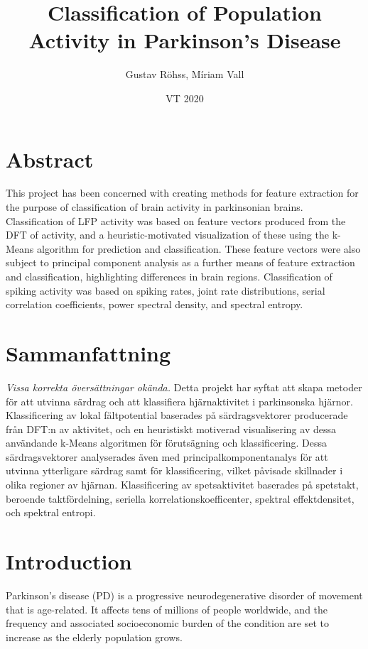 \documentclass{article}
\title{Classification of Population Activity in Parkinson's Disease}
\author{Gustav Röhss, Míriam Vall}
\date{VT 2020}
\begin{document}
\maketitle

\section*{Abstract}

This project has been concerned with creating methods for feature extraction for the purpose of classification of brain activity in parkinsonian brains. 
Classification of LFP activity was based on feature vectors produced from the DFT of activity, and a heuristic-motivated visualization of these using the k-Means algorithm for prediction and classification.
These feature vectors were also subject to principal component analysis as a further means of feature extraction and classification, highlighting differences in brain regions. 
Classification of spiking activity was based on spiking rates, joint rate distributions, serial correlation coefficients, power spectral density, and spectral entropy.

\section*{Sammanfattning}

\textit{Vissa korrekta översättningar okända.}
Detta projekt har syftat att skapa metoder för att utvinna särdrag och att klassifiera hjärnaktivitet i parkinsonska hjärnor.
Klassificering av lokal fältpotential baserades på särdragsvektorer producerade från DFT:n av aktivitet, och en heuristiskt motiverad visualisering av dessa användande k-Means algoritmen för förutsägning och klassificering.
Dessa särdragsvektorer analyserades även med principalkomponentanalys för att utvinna ytterligare särdrag samt för klassificering, vilket påvisade skillnader i olika regioner av hjärnan.
Klassificering av spetsaktivitet baserades på spetstakt, beroende taktfördelning, seriella korrelationskoefficenter, spektral effektdensitet, och spektral entropi.

\newpage
\tableofcontents

\newpage
\section{Introduction}

Parkinson's disease (PD) is a progressive neurodegenerative disorder of movement that is age-related. 
It affects tens of millions of people worldwide, and the frequency and associated socioeconomic burden of the condition are set to increase as the elderly population grows.
\end{document}
